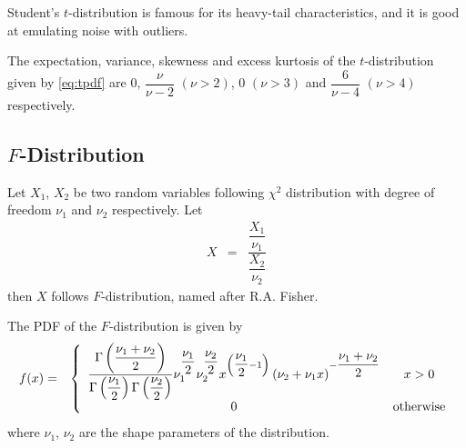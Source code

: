 Student's $t$-distribution is famous for its heavy-tail characteristics, and it is good at emulating noise with outliers.

The expectation, variance, skewness and excess kurtosis of the $t$-distribution given by \eqref{eq:tpdf} are $0$, $\dfrac{\nu}{\nu-2}$ $(\nu>2)$, $0$ $(\nu>3)$ and $\dfrac{6}{\nu-4}$ $(\nu>4)$ respectively.

\subsection{$F$-Distribution}

Let $X_1$, $X_2$ be two random variables following $\chi^2$ distribution with degree of freedom $\nu_1$ and $\nu_2$ respectively. Let
\begin{eqnarray}
	X &=& \dfrac{\dfrac{X_1}{\nu_1}}{\dfrac{X_2}{\nu_2}} \nonumber
\end{eqnarray}
then $X$ follows $F$-distribution, named after R.A. Fisher.

The PDF of the $F$-distribution is given by
\begin{eqnarray}
	f(x) &=& \left\{\begin{array}{cc}
		\dfrac{\Gamma\left(\dfrac{\nu_1+\nu_2}{2}\right)}{\Gamma\left(\dfrac{\nu_1}{2}\right)\Gamma\left(\dfrac{\nu_2}{2}\right)}\nu_1^{\dfrac{\nu_1}{2}}\nu_2^{\dfrac{\nu_2}{2}}x^{\left(\dfrac{\nu_1}{2}-1\right)}\left(\nu_2+\nu_1 x\right)^{-\dfrac{\nu_1+\nu_2}{2}} & x > 0 \\
		0 & \textup{otherwise}
	\end{array}\right. \nonumber
\end{eqnarray}
where $\nu_1$, $\nu_2$ are the shape parameters of the distribution. 
